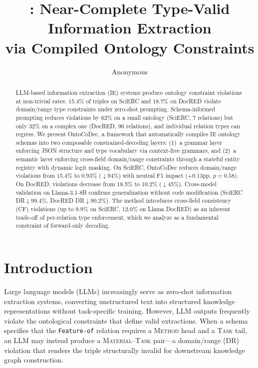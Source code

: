 \documentclass[11pt,a4paper]{article}
\title{\method{}: Near-Complete Type-Valid Information Extraction\\via Compiled Ontology Constraints}
\author{Anonymous}
\date{}
\newcommand{\method}{OntoCoDec}
\begin{document}
\maketitle

\begin{abstract}
LLM-based information extraction (IE) systems produce ontology constraint violations at non-trivial rates: 15.4\% of triples on SciERC and 18.7\% on DocRED violate domain/range type constraints under zero-shot prompting. Schema-informed prompting reduces violations by 62\% on a small ontology (SciERC, 7 relations) but only 32\% on a complex one (DocRED, 96 relations), and individual relation types can regress. We present \method{}, a framework that automatically compiles IE ontology schemas into two composable constrained-decoding layers: (1)~a grammar layer enforcing JSON structure and type vocabulary via context-free grammars, and (2)~a semantic layer enforcing cross-field domain/range constraints through a stateful entity registry with dynamic logit masking. On SciERC, \method{} reduces domain/range violations from 15.4\% to 0.93\% ($\downarrow$94\%) with neutral F1 impact ($+$0.13pp, $p{=}0.58$). On DocRED, violations decrease from 18.5\% to 10.2\% ($\downarrow$45\%). Cross-model validation on Llama-3.1-8B confirms generalization without code modification (SciERC DR$\downarrow$99.4\%, DocRED DR$\downarrow$90.2\%). The method introduces cross-field consistency (CF) violations (up to 9.9\% on SciERC, 12.0\% on Llama DocRED) as an inherent trade-off of per-relation type enforcement, which we analyze as a fundamental constraint of forward-only decoding.
\end{abstract}

\section{Introduction}
\label{sec:intro}

Large language models (LLMs) increasingly serve as zero-shot information extraction systems, converting unstructured text into structured knowledge representations without task-specific training. However, LLM outputs frequently violate the ontological constraints that define valid extractions. When a schema specifies that the \texttt{Feature-of} relation requires a \textsc{Method} head and a \textsc{Task} tail, an LLM may instead produce a \textsc{Material}--\textsc{Task} pair---a domain/range (DR) violation that renders the triple structurally invalid for downstream knowledge graph construction.
\end{document}
